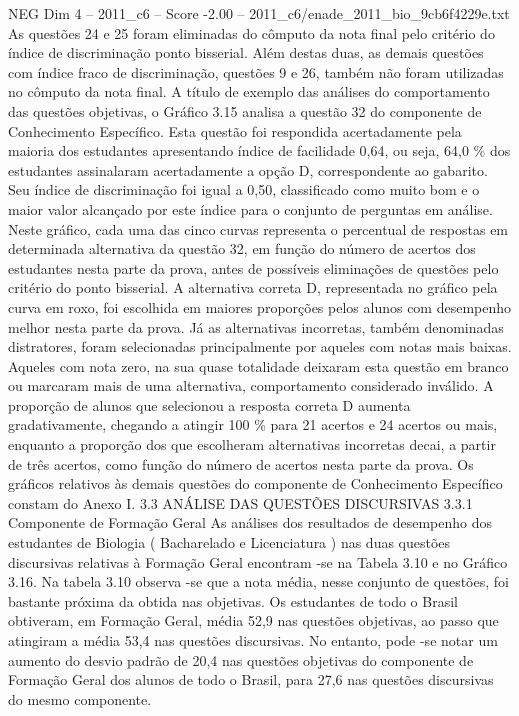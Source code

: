 \begin{textsample}{NEG Dim 4 – 2011\_c6 – Score -2.00 – 2011\_c6/enade\_2011\_bio\_9cb6f4229e.txt}
As questões 24 e 25 foram eliminadas do cômputo da nota final pelo critério do índice de discriminação ponto bisserial.
Além destas duas, as demais questões com índice fraco de discriminação, questões 9 e 26, também não foram utilizadas no cômputo da nota final.
A título de exemplo das análises do comportamento das questões objetivas, o Gráfico 3.15 analisa a questão 32 do componente de Conhecimento Específico.
Esta questão foi respondida acertadamente pela maioria dos estudantes apresentando índice de facilidade 0,64, ou seja, 64,0 \% dos estudantes assinalaram acertadamente a opção D, correspondente ao gabarito.
Seu índice de discriminação foi igual a 0,50, classificado como muito bom e o maior valor alcançado por este índice para o conjunto de perguntas em análise.
Neste gráfico, cada uma das cinco curvas representa o percentual de respostas em determinada alternativa da questão 32, em função do número de acertos dos estudantes nesta parte da prova, antes de possíveis eliminações de questões pelo critério do ponto bisserial.
A alternativa correta D, representada no gráfico pela curva em roxo, foi escolhida em maiores proporções pelos alunos com desempenho melhor nesta parte da prova.
Já as alternativas incorretas, também denominadas distratores, foram selecionadas principalmente por aqueles com notas mais baixas.
Aqueles com nota zero, na sua quase totalidade deixaram esta questão em branco ou marcaram mais de uma alternativa, comportamento considerado inválido.
A proporção de alunos que selecionou a resposta correta D aumenta gradativamente, chegando a atingir 100 \% para 21 acertos e 24 acertos ou mais, enquanto a proporção dos que escolheram alternativas incorretas decai, a partir de três acertos, como função do número de acertos nesta parte da prova.
Os gráficos relativos às demais questões do componente de Conhecimento Específico constam do Anexo I. 3.3 ANÁLISE DAS QUESTÕES DISCURSIVAS 3.3.1 Componente de Formação Geral As análises dos resultados de desempenho dos estudantes de Biologia ( Bacharelado e Licenciatura ) nas duas questões discursivas relativas à Formação Geral encontram -se na Tabela 3.10 e no Gráfico 3.16.
Na tabela 3.10 observa -se que a nota média, nesse conjunto de questões, foi bastante próxima da obtida nas objetivas.
Os estudantes de todo o Brasil obtiveram, em Formação Geral, média 52,9 nas questões objetivas, ao passo que atingiram a média 53,4 nas questões discursivas.
No entanto, pode -se notar um aumento do desvio padrão de 20,4 nas questões objetivas do componente de Formação Geral dos alunos de todo o Brasil, para 27,6 nas questões discursivas do mesmo componente.

\end{textsample}
